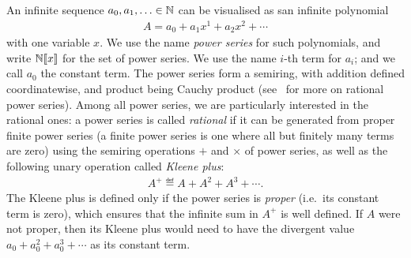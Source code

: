 An infinite sequence $a_0,a_1,\ldots \in \mathbb N$ can be visualised as san infinite  polynomial
\begin{align*}
 A = a_0 + a_1x^1 + a_2x^2 + \cdots
\end{align*}
with one variable $x$.
We use the name \emph{power series} for such polynomials, and write $\mathbb N [\![x]\!]$ for the set of power series. 
We use the name $i$-th term for $a_i$; and we call $a_0$ the constant term.   The power series form a semiring, with addition defined coordinatewise, and product being Cauchy product (see~\cite[part III]{sakarovitch2009elements} for more on rational power series). Among all power series, we are particularly interested in the rational ones: a power series is called \emph{rational} if it can be generated from proper finite power series (a finite power series is one where all but finitely many terms are zero) using the semiring operations $+$ and $\times$ of power series, as well as the following unary  operation called \emph{Kleene plus}:
\begin{align*}
 A^+ \eqdef A + A^2 + A^3 + \cdots.
\end{align*}  
The Kleene plus is defined only if the power series is  \emph{proper} (i.e.~its constant term is zero), which ensures that the infinite sum in $A^+$ is well defined. If $A$ were not proper, then its Kleene plus would need to have the divergent value $a_0 + a_0^2 + a_0^3 + \cdots$ as its constant term.


